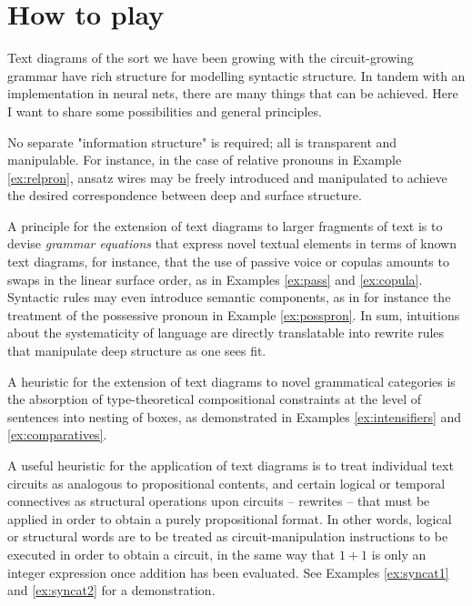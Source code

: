 \section{How to play}

Text diagrams of the sort we have been growing with the circuit-growing grammar have rich structure for modelling syntactic structure. In tandem with an implementation in neural nets, there are many things that can be achieved. Here I want to share some possibilities and general principles.

 No separate "information structure" is required; all is transparent and manipulable. For instance, in the case of relative pronouns in Example \ref{ex:relpron}, ansatz wires may be freely introduced and manipulated to achieve the desired correspondence between deep and surface structure.

 A principle for the extension of text diagrams to larger fragments of text is to devise \emph{grammar equations} \citep{coecke_grammar_2021} that express novel textual elements in terms of known text diagrams, for instance, that the use of passive voice or copulas amounts to swaps in the linear surface order, as in Examples \ref{ex:pass} and \ref{ex:copula}. Syntactic rules may even introduce semantic components, as in for instance the treatment of the possessive pronoun in Example \ref{ex:posspron}. In sum, intuitions about the systematicity of language are directly translatable into rewrite rules that manipulate deep structure as one sees fit.

 A heuristic for the extension of text diagrams to novel grammatical categories is the absorption of type-theoretical compositional constraints at the level of sentences into nesting of boxes, as demonstrated in Examples \ref{ex:intensifiers} and \ref{ex:comparatives}.

 A useful heuristic for the application of text diagrams is to treat individual text circuits as analogous to propositional contents, and certain logical or temporal connectives as structural operations upon circuits -- rewrites -- that must be applied in order to obtain a purely propositional format. In other words, logical or structural words are to be treated as circuit-manipulation instructions to be executed in order to obtain a circuit, in the same way that $1 + 1$ is only an integer expression once addition has been evaluated. See Examples \ref{ex:syncat1} and \ref{ex:syncat2} for a demonstration.


